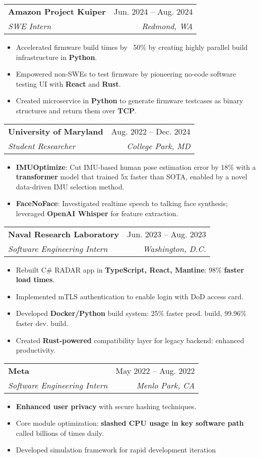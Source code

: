 \documentclass[letterpaper,11pt]{article}
\makeatletter
\newcommand{\resumeItem}[1]{
  \item\small{
    {#1 \vspace{-2pt}}
  }
}
\newcommand{\resumeSubheading}[4]{
  \vspace{-2pt}\item
    \begin{tabular*}{0.97\textwidth}[t]{l@{\extracolsep{\fill}}r}
      \textbf{#1} & #2 \\
      \textit{\small#3} & \textit{\small #4} \\
    \end{tabular*}\vspace{-7pt}
}
\newcommand{\resumeItemListStart}{\begin{itemize}}
\newcommand{\resumeItemListEnd}{\end{itemize}\vspace{-5pt}}
\makeatother
\begin{document}
    \resumeSubheading
      {Amazon Project Kuiper}{Jun. 2024 -- Aug. 2024}
      {SWE Intern}{Redmond, WA}
      \resumeItemListStart
        \resumeItem{Accelerated firmware build times by ~50\% by creating highly parallel build infrastructure in \textbf{Python}.}
        \resumeItem{Empowered non-SWEs to test firmware by pioneering no-code software testing UI with \textbf{React} and \textbf{Rust}.}
        \resumeItem{Created microservice in \textbf{Python} to generate firmware testcases as binary structures and return them over \textbf{TCP}.}
      \resumeItemListEnd

    \resumeSubheading
      {University of Maryland}{Aug. 2022 -- Dec. 2024}
      {Student Researcher}{College Park, MD}
      \resumeItemListStart
        \resumeItem{\textbf{IMUOptimize}: Cut IMU-based human pose estimation error by 18\% with a \textbf{transformer} model that trained 5x faster than SOTA, enabled by a novel data-driven IMU selection method.}
        \resumeItem{\textbf{FaceNoFace}: Investigated realtime speech to talking face synthesis; leveraged \textbf{OpenAI Whisper} for feature extraction.}
      \resumeItemListEnd

    \resumeSubheading
      {Naval Research Laboratory}{Jun. 2023 -- Aug. 2023}
      {Software Engineering Intern}{Washington, D.C.}
      \resumeItemListStart
        \resumeItem{Rebuilt C\# RADAR app in \textbf{TypeScript, React, Mantine}: 98\% \textbf{faster load times}.}
        \resumeItem{Implemented mTLS authentication to enable login with DoD access card.}
        \resumeItem{Developed \textbf{Docker/Python} build system: 25\% faster prod. build, 99.96\% faster dev. build.}
        \resumeItem{Created \textbf{Rust-powered} compatibility layer for legacy backend: enhanced productivity.}
      \resumeItemListEnd

    \resumeSubheading
      {Meta}{May 2022 -- Aug. 2022}
      {Software Engineering Intern}{Menlo Park, CA}
      \resumeItemListStart
        \resumeItem{\textbf{Enhanced user privacy} with secure hashing techniques.}
        \resumeItem{Core module optimization: \textbf{slashed CPU usage in key software path} called billions of times daily.}
        \resumeItem{Developed simulation framework for rapid development iteration}
      \resumeItemListEnd
\end{document}
